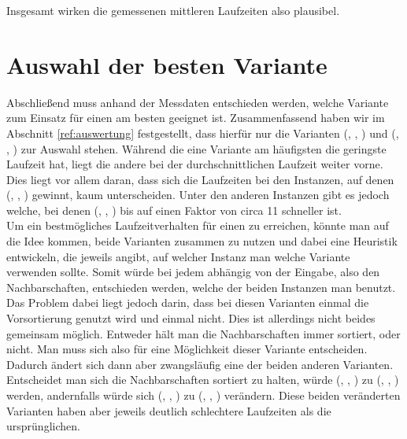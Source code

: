 Insgesamt wirken die gemessenen mittleren Laufzeiten 
also plausibel.




\section{Auswahl der besten Variante}
\label{sec:entscheidung}
Abschließend muss anhand der Messdaten entschieden werden, welche Variante zum Einsatz für
einen \ct{} am besten geeignet ist.
Zusammenfassend haben wir im Abschnitt \ref{ref:auswertung} festgestellt, 
dass hierfür nur die Varianten (\SorSor, \true, \distr) und (\SeaUSet, \false, \perm) zur Auswahl stehen.
Während die eine Variante am häufigsten die geringste Laufzeit hat, liegt die andere 
bei der durchschnittlichen Laufzeit weiter vorne. Dies liegt vor allem daran, dass sich 
die Laufzeiten bei den Instanzen, auf denen (\SeaUSet, \false, \perm) \glqq gewinnt\grqq{}, kaum unterscheiden.
Unter den anderen Instanzen gibt es jedoch welche, bei denen (\SorSor, \true, \distr) bis auf einen
Faktor von circa 11 schneller ist.
\\

Um ein bestmögliches Laufzeitverhalten für einen \ct{} zu erreichen, könnte man auf die Idee kommen, 
beide Varianten zusammen zu nutzen
und dabei eine Heuristik entwickeln, die jeweils angibt,
auf welcher Instanz man welche Variante verwenden sollte. Somit würde bei jedem \ct{} abhängig von 
der Eingabe, also den Nachbarschaften, entschieden werden, welche der beiden Instanzen man benutzt. 
Das Problem dabei liegt jedoch darin, dass bei diesen Varianten einmal die Vorsortierung
genutzt wird und einmal nicht. Dies ist allerdings nicht beides gemeinsam möglich. Entweder hält man die
Nachbarschaften immer sortiert, oder nicht. Man muss sich also für eine Möglichkeit dieser
Variante  entscheiden. Dadurch ändert sich dann aber zwangsläufig  eine der beiden anderen Varianten. 
Entscheidet man sich die Nachbarschaften sortiert zu halten, würde (\SeaUSet, \false, \perm) zu (\SeaUSet, \true, \perm){}
werden, andernfalls würde sich (\SorSor, \true, \distr) zu (\SorSor, \false, \distr) verändern.
Diese beiden \glqq veränderten\grqq{} Varianten haben aber jeweils deutlich schlechtere Laufzeiten
als die ursprünglichen.
\\


